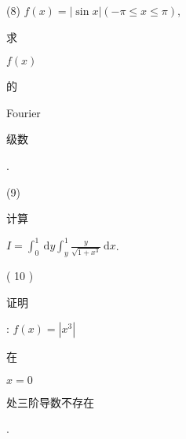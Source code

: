 \documentclass[10pt]{article}
\begin{document}
(8) $f(x)=|\sin x|(-\pi \leqslant x \leqslant \pi)$, \begin{CJK}{UTF8}{mj}求\end{CJK} $f(x)$ \begin{CJK}{UTF8}{mj}的\end{CJK} Fourier \begin{CJK}{UTF8}{mj}级数\end{CJK}.

(9) \begin{CJK}{UTF8}{mj}计算\end{CJK} $I=\int_{0}^{1} \mathrm{~d} y \int_{y}^{1} \frac{y}{\sqrt{1+x^{3}}} \mathrm{~d} x$.

( 10 ) \begin{CJK}{UTF8}{mj}证明\end{CJK}: $f(x)=\left|x^{3}\right|$ \begin{CJK}{UTF8}{mj}在\end{CJK} $x=0$ \begin{CJK}{UTF8}{mj}处三阶导数不存在\end{CJK}.
\end{document}
